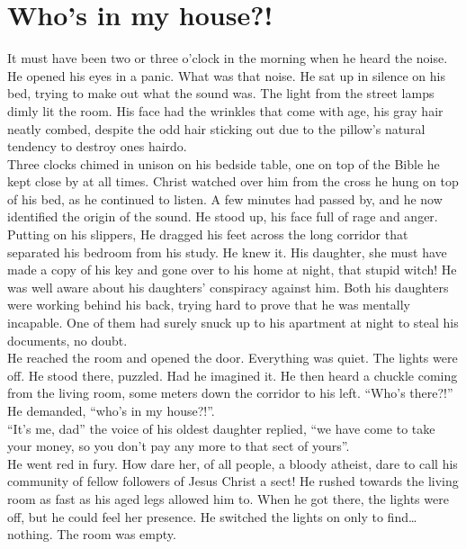 \documentclass[a4paper,onecolumn,11pt]{article}
\begin{document}
\newpage


\section{Who's in my house?!}

It must have been two or three o’clock in the morning when he heard the noise. He opened his eyes in a panic. What was that noise. He sat up in silence on his bed, trying to make out what the sound was. The light from the street lamps dimly lit the room. His face had the wrinkles that come with age, his gray hair neatly combed, despite the odd hair sticking out due to the pillow's natural tendency to destroy ones hairdo.\\
\newline
Three clocks chimed in unison on his bedside table, one on top of the Bible he kept close by at all times. Christ watched over him from the cross he hung on top of his bed, as he continued to listen. A few minutes had passed by, and he now identified the origin of the sound. He stood up, his face full of rage and anger. Putting on his slippers, He dragged his feet across the long corridor that separated his bedroom from his study. He knew it. His daughter, she must have made a copy of his key and gone over to his home at night, that stupid witch! He was well aware about his daughters’ conspiracy against him. Both his daughters were working behind his back, trying hard to prove that he was mentally incapable. One of them had surely snuck up to his apartment at night to steal his documents, no doubt.\\
\newline
He reached the room and opened the door. Everything was quiet. The lights were off. He stood there, puzzled. Had he imagined it. He then heard a chuckle coming from the living room, some meters down the corridor to his left.
``Who's there?!'' He demanded, ``who's in my house?!''.\\
``It's me, dad'' the voice of his oldest daughter replied, ``we have come to take your money, so you don't pay any more to that sect of yours''.\\
\newline
He went red in fury. How dare her, of all people, a bloody atheist, dare to call his community of fellow followers of Jesus Christ a sect! He rushed towards the living room as fast as his aged legs allowed him to. When he got there, the lights were off, but he could feel her presence. He switched the lights on only to find\ldots nothing. The room was empty. \\
\end{document}
